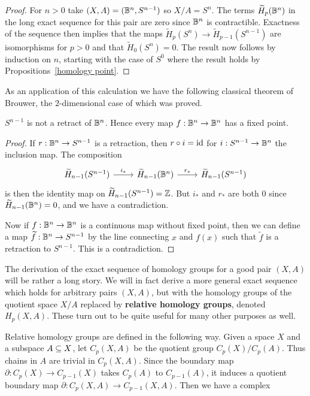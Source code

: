 \begin{proof}
For $n>0$ take $(X,A)=(\mathbb{B}^n,S^{n-1})$ so $X/A=S^n$. The terms $\widetilde{H}_p(\mathbb{B}^n)$ in the long exact sequence for this pair are zero since $\mathbb{B}^n$ is contractible. Exactness of the
sequence then implies that the maps $\widetilde{H}_p(S^n)\to\widetilde{H}_{p-1}(S^{n-1})$ are isomorphisms for $p>0$ and that $\widetilde{H}_0(S^n)=0$. The result now follows by induction on $n$, starting with
the case of $S^0$ where the result holds by Propositions~\ref{homology point}.
\end{proof}
As an application of this calculation we have the following classical theorem of Brouwer, the $2$-dimensional case of which was proved.
\begin{corollary}
$S^{n-1}$ is not a retract of $\mathbb{B}^n$. Hence every map $f:\mathbb{B}^n\to\mathbb{B}^n$ has a fixed point.
\end{corollary}
\begin{proof}
If $r:\mathbb{B}^n\to S^{n-1}$ is a retraction, then $r\circ i=\mathrm{id}$ for $i:S^{n-1}\to\mathbb{B}^n$ the inclusion map. The composition
\[\begin{tikzcd}
\widetilde{H}_{n-1}(S^{n-1})\ar[r,"i_*"]&\widetilde{H}_{n-1}(\B^n)\ar[r,"r_*"]&\widetilde{H}_{n-1}(S^{n-1})
\end{tikzcd}\]
is then the identity map on $\widetilde{H}_{n-1}(S^{n-1})=\mathbb{Z}$. But $i_*$ and $r_*$ are both $0$ since $\widetilde{H}_{n-1}(\mathbb{B}^n)=0$, and we have a
contradiction.\par
Now if $f:\mathbb{B}^n\to\mathbb{B}^n$ is a continuous map without fixed point, then we can define a map $\widetilde{f}:\mathbb{B}^n\to S^{n-1}$ by the line connecting $x$ and $f(x)$ such that 
$\widetilde{f}$ is a retraction to $S^{n-1}$. This is a contradiction.
\end{proof}
The derivation of the exact sequence of homology groups for a good pair $(X,A)$ will be rather a long story. We will in fact derive a more general exact sequence which holds for arbitrary pairs $(X,A)$, but with the homology groups of the quotient space $X/A$ replaced by \textbf{relative homology groups}, denoted $H_p(X,A)$. These turn out to be quite useful for many other purposes as well.\par
Relative homology groups are defined in the following way. Given a space $X$ and a subspace $A\subseteq X$, let $C_p(X,A)$ be the quotient group $C_p(X)/C_p(A)$. Thus chains in $A$ are trivial in $C_p(X,A)$. Since the boundary map $\partial:C_p(X)\to C_{p-1}(X)$ takes $C_p(A)$ to $C_{p-1}(A)$, it induces a quotient boundary map $\partial:C_p(X,A)\to C_{p-1}(X,A)$. Then we have a complex
